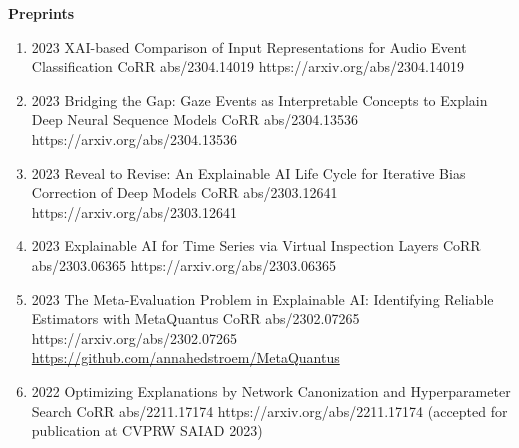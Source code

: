\headedsection %
{\bf Preprints}{}
{
    \begin{enumerate}

        \item {}
                        {2023}
                        {XAI-based Comparison of Input Representations for Audio Event Classification}
                        {CoRR abs/2304.14019}
                        {https://arxiv.org/abs/2304.14019}
        
        \item {}
                        {2023}
                        {Bridging the Gap: Gaze Events as Interpretable Concepts to Explain Deep Neural Sequence Models}
                        {CoRR abs/2304.13536}
                        {https://arxiv.org/abs/2304.13536}
        
        \item {}
                        {2023}
                        {Reveal to Revise: An Explainable AI Life Cycle for Iterative Bias Correction of Deep Models}
                        {CoRR abs/2303.12641}
                        {https://arxiv.org/abs/2303.12641}
        
        \item {}
                        {2023}
                        {Explainable AI for Time Series via Virtual Inspection Layers}
                        {CoRR abs/2303.06365}
                        {https://arxiv.org/abs/2303.06365}

        \item {}
                        {2023}
                        {The Meta-Evaluation Problem in Explainable AI: Identifying Reliable Estimators with MetaQuantus}
                        {CoRR abs/2302.07265}
                        {https://arxiv.org/abs/2302.07265}
                        {\href{https://github.com/annahedstroem/MetaQuantus}{https://github.com/annahedstroem/MetaQuantus}}

        \item {}
                        {2022}
                        {Optimizing Explanations by Network Canonization and Hyperparameter Search}
                        {CoRR abs/2211.17174}
                        {https://arxiv.org/abs/2211.17174}
                        {(accepted for publication at CVPRW SAIAD 2023)}


\end{enumerate}}
